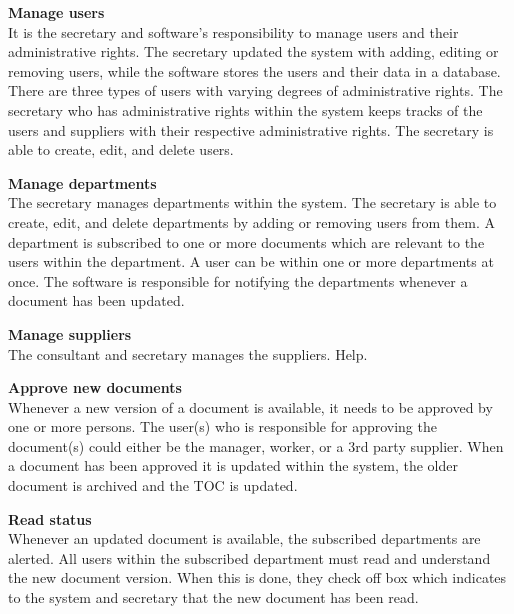 \textbf{Manage users}
\\
It is the secretary and software's responsibility to manage users and their administrative rights.
The secretary updated the system with adding, editing or removing users, while the software stores the users and their data in a database.
There are three types of users with varying degrees of administrative rights.
The secretary who has administrative rights within the system keeps tracks of the users and suppliers with their respective administrative rights.
The secretary is able to create, edit, and delete users.

\textbf{Manage departments}
\\%
The secretary manages departments within the system.
The secretary is able to create, edit, and delete departments by adding or removing users from them.
A department is subscribed to one or more documents which are relevant to the users within the department.
A user can be within one or more departments at once.
The software is responsible for notifying the departments whenever a document has been updated.

\textbf{Manage suppliers}
\\
The consultant and secretary manages the suppliers. Help.

\textbf{Approve new documents}
\\
Whenever a new version of a document is available, it needs to be approved by one or more persons.
The user(s) who is responsible for approving the document(s) could either be the manager, worker, or a 3rd party supplier.
When a document has been approved it is updated within the system, the older document is archived and the TOC is updated.

\textbf{Read status}
\\
Whenever an updated document is available, the subscribed departments are alerted.
All users within the subscribed department must read and understand the new document version.
When this is done, they check off box which indicates to the system and secretary that the new document has been read.


